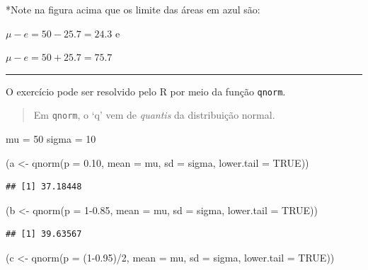 \documentclass[
]{book}
\newenvironment{Shaded}{\begin{snugshade}}{\end{snugshade}}
\newcommand{\AttributeTok}[1]{\textcolor[rgb]{0.77,0.63,0.00}{#1}}
\newcommand{\ConstantTok}[1]{\textcolor[rgb]{0.00,0.00,0.00}{#1}}
\newcommand{\DecValTok}[1]{\textcolor[rgb]{0.00,0.00,0.81}{#1}}
\newcommand{\FloatTok}[1]{\textcolor[rgb]{0.00,0.00,0.81}{#1}}
\newcommand{\FunctionTok}[1]{\textcolor[rgb]{0.00,0.00,0.00}{#1}}
\newcommand{\NormalTok}[1]{#1}
\newcommand{\OtherTok}[1]{\textcolor[rgb]{0.56,0.35,0.01}{#1}}
\newcommand{\SpecialCharTok}[1]{\textcolor[rgb]{0.00,0.00,0.00}{#1}}
\begin{document}
*Note na figura acima que os limite das áreas em azul são:

\(\mu - e = 50 - 25.7 = 24.3\) e

\(\mu - e = 50 + 25.7 = 75.7\)

\begin{center}\rule{0.5\linewidth}{0.5pt}\end{center}

O exercício pode ser resolvido pelo R por meio da função \texttt{qnorm}.

\begin{quote}
Em \texttt{qnorm}, o `q' vem de \emph{quantis} da distribuição normal.
\end{quote}

\begin{Shaded}
\begin{Highlighting}[]
\NormalTok{mu }\OtherTok{=} \DecValTok{50}
\NormalTok{sigma }\OtherTok{=} \DecValTok{10}

\NormalTok{(a }\OtherTok{\textless{}{-}} \FunctionTok{qnorm}\NormalTok{(}\AttributeTok{p =} \FloatTok{0.10}\NormalTok{, }\AttributeTok{mean =}\NormalTok{ mu, }\AttributeTok{sd =}\NormalTok{ sigma, }\AttributeTok{lower.tail =} \ConstantTok{TRUE}\NormalTok{))}
\end{Highlighting}
\end{Shaded}

\begin{verbatim}
## [1] 37.18448
\end{verbatim}

\begin{Shaded}
\begin{Highlighting}[]
\NormalTok{(b }\OtherTok{\textless{}{-}} \FunctionTok{qnorm}\NormalTok{(}\AttributeTok{p =} \DecValTok{1}\FloatTok{{-}0.85}\NormalTok{, }\AttributeTok{mean =}\NormalTok{ mu, }\AttributeTok{sd =}\NormalTok{ sigma, }\AttributeTok{lower.tail =} \ConstantTok{TRUE}\NormalTok{))}
\end{Highlighting}
\end{Shaded}

\begin{verbatim}
## [1] 39.63567
\end{verbatim}

\begin{Shaded}
\begin{Highlighting}[]
\NormalTok{(c }\OtherTok{\textless{}{-}} \FunctionTok{qnorm}\NormalTok{(}\AttributeTok{p =}\NormalTok{ (}\DecValTok{1}\FloatTok{{-}0.95}\NormalTok{)}\SpecialCharTok{/}\DecValTok{2}\NormalTok{, }\AttributeTok{mean =}\NormalTok{ mu, }\AttributeTok{sd =}\NormalTok{ sigma, }\AttributeTok{lower.tail =} \ConstantTok{TRUE}\NormalTok{))}
\end{Highlighting}
\end{Shaded}
\end{document}
